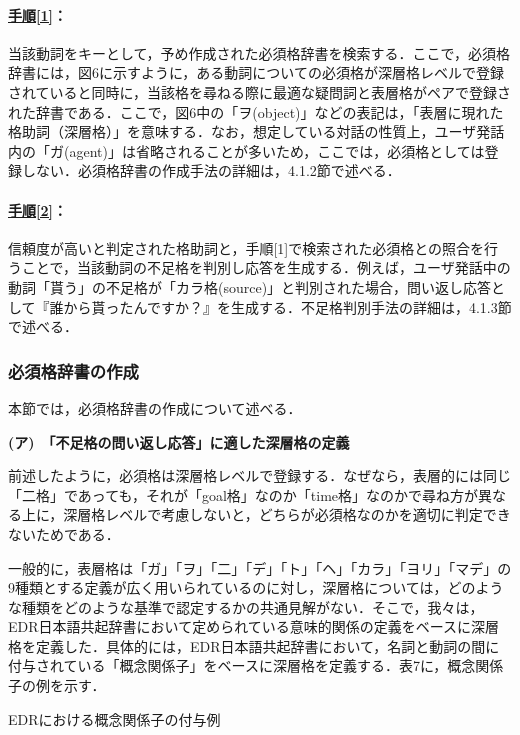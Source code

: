 \documentclass[japanese]{jnlp_1.4}
\begin{document}
\paragraph{\underline{手順[1]}：}当該動詞をキーとして，予め作成された必須格辞書を検索する．ここで，必須格辞書には，図6に示すように，ある動詞についての必須格が深層格レベルで登録されていると同時に，当該格を尋ねる際に最適な疑問詞と表層格がペアで登録された辞書である．ここで，図6中の「ヲ(object)」などの表記は，「表層に現れた格助詞（深層格）」を意味する．なお，想定している対話の性質上，ユーザ発話内の「ガ(agent)」は省略されることが多いため，ここでは，必須格としては登録しない．必須格辞書の作成手法の詳細は，4.1.2節で述べる．

\paragraph{\underline{手順[2]}：}信頼度が高いと判定された格助詞と，手順[1]で検索された必須格との照合を行うことで，当該動詞の不足格を判別し応答を生成する．例えば，ユーザ発話中の動詞「貰う」の不足格が「カラ格(source)」と判別された場合，問い返し応答として『誰から貰ったんですか？』を生成する．不足格判別手法の詳細は，4.1.3節で述べる．


\subsubsection{必須格辞書の作成}

本節では，必須格辞書の作成について述べる．


\noindent\textbf{(ア)　「不足格の問い返し応答」に適した深層格の定義}

前述したように，必須格は深層格レベルで登録する．なぜなら，表層的には同じ「二格」であっても，それが「goal格」なのか「time格」なのかで尋ね方が異なる上に，深層格レベルで考慮しないと，どちらが必須格なのかを適切に判定できないためである．

一般的に，表層格は「ガ」「ヲ」「二」「デ」「ト」「ヘ」「カラ」「ヨリ」「マデ」の9種類とする定義が広く用いられているのに対し，深層格については，どのような種類をどのような基準で認定するかの共通見解がない．そこで，我々は，EDR日本語共起辞書\cite{no45}において定められている意味的関係の定義をベースに深層格を定義した．具体的には，EDR日本語共起辞書において，名詞と動詞の間に付与されている「概念関係子」をベースに深層格を定義する．表7に，概念関係子の例を示す．

\begin{table}[b]
\caption{EDRにおける概念関係子の付与例}
\label{table:7}

\end{table}
\end{document}
